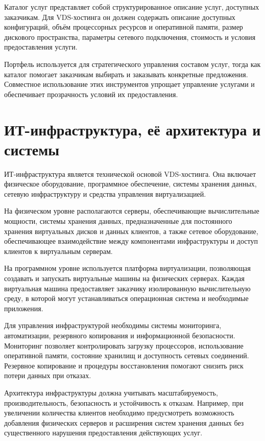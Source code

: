 \documentclass[14pt,a4paper]{extarticle}
\begin{document}
Каталог услуг представляет собой структурированное описание услуг, доступных заказчикам. Для VDS-хостинга он должен содержать описание доступных конфигураций, объём процессорных ресурсов и оперативной памяти, размер дискового пространства, параметры сетевого подключения, стоимость и условия предоставления услуги.

Портфель используется для стратегического управления составом услуг, тогда как каталог помогает заказчикам выбирать и заказывать конкретные предложения. Совместное использование этих инструментов упрощает управление услугами и обеспечивает прозрачность условий их предоставления.

\section{ИТ-инфраструктура, её архитектура и системы}

ИТ-инфраструктура является технической основой VDS-хостинга. Она включает физическое оборудование, программное обеспечение, системы хранения данных, сетевую инфраструктуру и средства управления виртуализацией.

На физическом уровне располагаются серверы, обеспечивающие вычислительные мощности, системы хранения данных, предназначенные для постоянного хранения виртуальных дисков и данных клиентов, а также сетевое оборудование, обеспечивающее взаимодействие между компонентами инфраструктуры и доступ клиентов к виртуальным серверам.

На программном уровне используется платформа виртуализации, позволяющая создавать и запускать виртуальные машины на физических серверах. Каждая виртуальная машина предоставляет заказчику изолированную вычислительную среду, в которой могут устанавливаться операционная система и необходимые приложения.

Для управления инфраструктурой необходимы системы мониторинга, автоматизации, резервного копирования и информационной безопасности. Мониторинг позволяет контролировать загрузку процессоров, использование оперативной памяти, состояние хранилищ и доступность сетевых соединений. Резервное копирование и процедуры восстановления помогают снизить риск потери данных при отказах.

Архитектура инфраструктуры должна учитывать масштабируемость, производительность, безопасность и устойчивость к отказам. Например, при увеличении количества клиентов необходимо предусмотреть возможность добавления физических серверов и расширения систем хранения данных без существенного нарушения предоставления действующих услуг.
\end{document}
